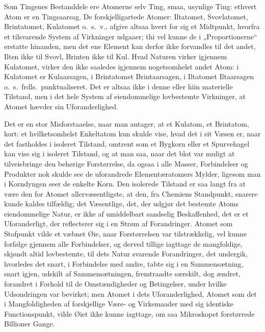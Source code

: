 \documentclass[12pt,a4paper]{book}
\begin{document}
Som Tingenes Bestanddele ere Atomerne selv Ting,
smaa, usynlige Ting: ethvert Atom er en Tingsaarsag. De
forskjelligartede Atomer: Iltatomet, Svovlatomet, Brintatomet,
Kulatomet o.~s.~v., afgive altsaa hvert for sig et Midtpunkt,
hvorfra et tilsvarende System af Virkninger udgaaer; thi vel
kunne de i „Proportionerne“ erstatte hinanden, men det ene
Element kan derfor ikke forvandles til det andet, Ilten ikke
til Svovl, Brinten ikke til Kul. Hvad Naturen virker
igjennem Kulatomet, virker den ikke saaledes igjennem
nogetsomhelst andet Atom: i Kulatomet er Kulaarsagen, i
Brintatomet Brintaarsagen, i Iltatomet Iltaarsagen o.~s.~frdls.\
punktualiseret. Det er altsaa ikke i denne eller hiin materielle
Tilstand, men i det hele System af eiendommelige
lovbestemte Virkninger, at Atomet hævder sin Uforanderlighed.

Det er en stor Misforstaaelse, naar man antager, at
et Kulatom, et Brintatom, kort: et hvilketsomhelst Enkeltatom
kun skulde vise, hvad det i sit Væsen er, naar det fastholdes
i isoleret Tilstand, omtrent som et Bygkorn eller et
Spurvehagel kan vise sig i isoleret Tilstand, og at man saa, naar
det blot var muligt at tilveiebringe den behørige Forstørrelse,
da ogsaa i alle Masser, Forbindelser og Produkter nok skulde
see de uforandrede Elementæratomers Mylder, ligesom man
i Korndyngen seer de enkelte Korn. Den isolerede Tilstand
er saa langt fra at være den for Atomet allervæsentligste, at
den, fra Chemiens Standpunkt, snarere kunde kaldes tilfældig;
det Væsentlige, det, der udgjør det bestemte Atoms
eiendommelige Natur, er ikke af umiddelbart sandselig Beskaffenhed, det
er et Uforanderligt, der reflecterer sig i en Strøm af
Forandringer. Atomet som Stofpunkt vilde et væbnet Øie, naar
Forstørrelsen var tilstrækkelig, vel kunne forfølge gjennem alle
Forbindelser, og derved tillige iagttage de mangfoldige, skjøndt
altid lovbestemte, til dets Natur svarende Forandringer, det
undergik, hvorledes det snart, i Forbindelse med andre, tabte
sig i en Sammensætning, snart igjen, udskilt af
Sammensætningen, fremtraadte særskilt, dog ændret, forandret i
Forhold til de Omstændigheder og Betingelser, under hvilke
Udsondringen var bevirket; men Atomet i dets Uforanderlighed,
Atomet som det i Mangfoldigheden af forskjellige Være- og
Virkemaader med sig identiske Functionspunkt, vilde Øiet
ikke kunne iagttage, om saa Mikroskopet forstørrede Billioner
Gange.
\end{document}
